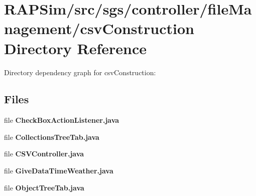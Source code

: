 \section{R\-A\-P\-Sim/src/sgs/controller/file\-Management/csv\-Construction Directory Reference}
\label{dir_380013c129f2e56345bd801f5c869791}
Directory dependency graph for csv\-Construction\-:
\subsection*{Files}
\begin{DoxyCompactItemize}
\item 
file {\bf Check\-Box\-Action\-Listener.\-java}
\item 
file {\bf Collections\-Tree\-Tab.\-java}
\item 
file {\bf C\-S\-V\-Controller.\-java}
\item 
file {\bf Give\-Data\-Time\-Weather.\-java}
\item 
file {\bf Object\-Tree\-Tab.\-java}
\end{DoxyCompactItemize}
